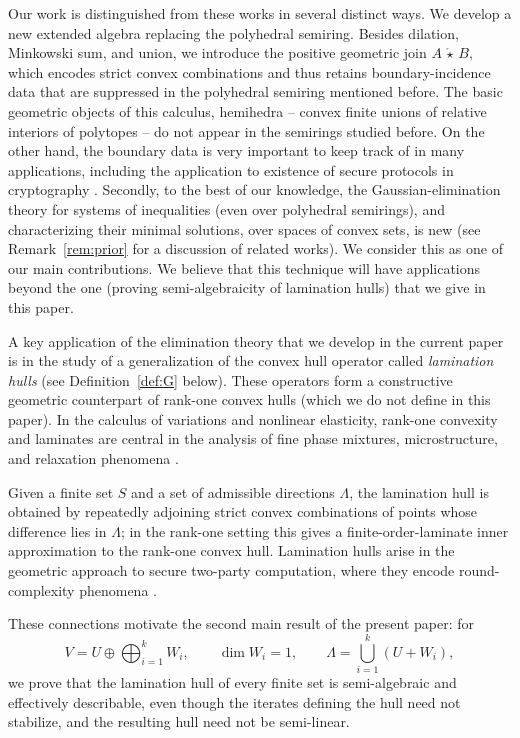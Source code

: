 \documentclass[10pt]{amsart}
\theoremstyle{plain}
\theoremstyle{definition}
\providecommand{\cmult}[0]{\ensuremath{{\,\mathring{\star}\,}}\xspace}
\begin{document}
\medskip
Our work is distinguished from these works in several 
distinct ways. 
We develop a new extended algebra replacing the polyhedral semiring.
Besides dilation, Minkowski sum, and union, we introduce the positive geometric join $A\cmult B$, which encodes strict convex combinations and thus retains boundary-incidence data that are suppressed in the polyhedral semiring
mentioned before.
The basic geometric objects of this calculus, hemihedra -- convex finite unions of relative interiors of polytopes -- do not appear in the semirings
studied before. On the other hand, the boundary data is very important 
to keep track of in many applications, including the application to 
existence of secure protocols in cryptography \cite{FOCS:BKMN22}.
Secondly, to the best of our knowledge, the Gaussian-elimination theory for systems of inequalities (even over polyhedral semirings), and characterizing their minimal solutions, over spaces of convex sets, is new (see Remark~\ref{rem:prior} for a discussion of related works). 
We consider this as one of our main contributions. We believe that this technique will have applications beyond the one (proving semi-algebraicity of lamination hulls) that we give in this paper.  

\medskip
A key application of the elimination theory that we develop in the current paper is in the study of a generalization of the convex hull operator  
called \emph{lamination hulls}  (see Definition~\ref{def:G} below).
These operators form a
constructive geometric counterpart of rank-one convex hulls (which we do not define in this paper). In the
calculus of variations and nonlinear elasticity, rank-one convexity and
laminates are central in the analysis of fine phase mixtures,
microstructure, and relaxation phenomena \cite{Morrey52,Ball-James1987,Dacorogna1989}. 

\medskip
Given
a finite set \(S\) and a set of admissible directions \(\Lambda\), the
lamination hull is obtained by repeatedly adjoining strict convex
combinations of points whose difference lies in \(\Lambda\); in the
rank-one setting this gives a finite-order-laminate inner approximation
to the rank-one convex hull. 
Lamination hulls arise in the geometric approach to
secure two-party computation, where they encode round-complexity
phenomena \cite{FOCS:BKMN22,BKMN23}. 

\medskip
These connections motivate the second
main result of the present paper: for
\[
V=U\oplus\bigoplus_{i=1}^k W_i,\qquad
\dim W_i=1,\qquad
\Lambda=\bigcup_{i=1}^k (U+W_i),
\]
we prove that the lamination hull of every finite set is
semi-algebraic and effectively describable, even though the iterates
defining the hull need not stabilize, and the resulting hull need not
be semi-linear.
\end{document}
